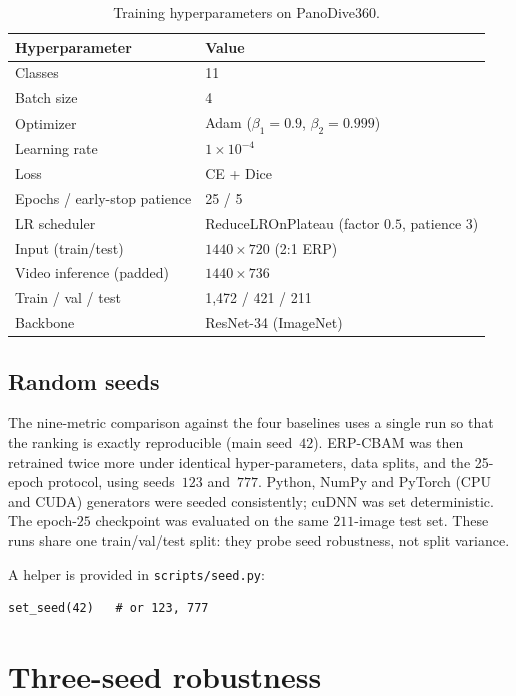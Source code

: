 \documentclass[11pt,a4paper]{article}
\begin{document}
\begin{table}[t]
\centering
\caption{Training hyperparameters on PanoDive360.}
\label{tab:hyper}
\begin{tabular}{ll}
\toprule
\textbf{Hyperparameter} & \textbf{Value} \\
\midrule
Classes & 11 \\
Batch size & 4 \\
Optimizer & Adam ($\beta_1=0.9$, $\beta_2=0.999$) \\
Learning rate & $1\times10^{-4}$ \\
Loss & CE + Dice \\
Epochs / early-stop patience & 25 / 5 \\
LR scheduler & ReduceLROnPlateau (factor $0.5$, patience $3$) \\
Input (train/test) & $1440\times720$ (2:1 ERP) \\
Video inference (padded) & $1440\times736$ \\
Train / val / test & 1{,}472 / 421 / 211 \\
Backbone & ResNet-34 (ImageNet) \\
\bottomrule
\end{tabular}
\end{table}

\subsection{Random seeds}
The nine-metric comparison against the four baselines uses a single
run so that the ranking is exactly reproducible (main seed~$42$).
ERP-CBAM was then retrained twice more under identical
hyper-parameters, data splits, and the 25-epoch protocol, using
seeds~$123$ and~$777$.
Python, NumPy and PyTorch (CPU and CUDA) generators were seeded
consistently; cuDNN was set deterministic.
The epoch-$25$ checkpoint was evaluated on the same $211$-image test
set.
These runs share one train/val/test split: they probe seed robustness,
not split variance.

A helper is provided in \texttt{scripts/seed.py}:
\begin{verbatim}
set_seed(42)   # or 123, 777
\end{verbatim}

\section{Three-seed robustness}
\label{sec:seeds}
\end{document}
